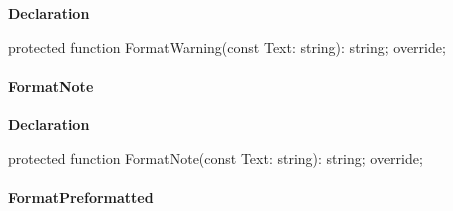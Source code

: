 \documentclass{report}
\newif\ifpdf
\begin{document}
\label{PasDoc_GenHtml.TGenericHTMLDocGenerator-FormatWarning}
\begin{list}{}{
\setlength{\itemindent}{0cm}
\setlength{\listparindent}{0cm}
\setlength{\leftmargin}{\evensidemargin}
\addtolength{\leftmargin}{\tmplength}
\settowidth{\labelsep}{X}
\addtolength{\leftmargin}{\labelsep}
\setlength{\labelwidth}{\tmplength}
}
\item[\textbf{Declaration}\hfill]
\ifpdf
\begin{flushleft}
\fi
\begin{ttfamily}
protected function FormatWarning(const Text: string): string; override;\end{ttfamily}

\ifpdf
\end{flushleft}
\fi

\end{list}
\paragraph*{FormatNote}\hspace*{\fill}

\label{PasDoc_GenHtml.TGenericHTMLDocGenerator-FormatNote}
\begin{list}{}{
\setlength{\itemindent}{0cm}
\setlength{\listparindent}{0cm}
\setlength{\leftmargin}{\evensidemargin}
\addtolength{\leftmargin}{\tmplength}
\settowidth{\labelsep}{X}
\addtolength{\leftmargin}{\labelsep}
\setlength{\labelwidth}{\tmplength}
}
\item[\textbf{Declaration}\hfill]
\ifpdf
\begin{flushleft}
\fi
\begin{ttfamily}
protected function FormatNote(const Text: string): string; override;\end{ttfamily}

\ifpdf
\end{flushleft}
\fi

\end{list}
\paragraph*{FormatPreformatted}\hspace*{\fill}
\end{document}
